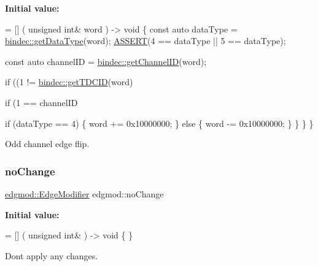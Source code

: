 {\bfseries Initial value\+:}
\begin{DoxyCode}
= [] (
    \textcolor{keywordtype}{unsigned} \textcolor{keywordtype}{int}& word
) -> \textcolor{keywordtype}{void} \{
    \textcolor{keyword}{const} \textcolor{keyword}{auto} dataType = \hyperlink{namespacebindec_a7a98adfd04c65f870f74a423bfd744fe}{bindec::getDataType}(word);
    \hyperlink{_debug_8hpp_aca68c0d4ac8df0838e209fb5300f7be3}{ASSERT}(4 == dataType || 5 == dataType);

    \textcolor{keyword}{const} \textcolor{keyword}{auto} channelID = \hyperlink{namespacebindec_af1997af0743251d010780a8f728fcd7e}{bindec::getChannelID}(word);
    
    \textcolor{keywordflow}{if} ((1 != \hyperlink{namespacebindec_a05afce2b4e8802eeb8b452bc1ec6de8b}{bindec::getTDCID}(word)%
        
        
        \textcolor{keywordflow}{if} (1 == channelID%
            
            \textcolor{keywordflow}{if} (dataType == 4) \{
                word += 0x10000000;
            \} \textcolor{keywordflow}{else} \{
                word -= 0x10000000;
            \}
        \}
    \}
\}
\end{DoxyCode}


Odd channel edge flip. 

\mbox{\label{namespaceedgmod_a912724097db2099cc7793a83e42673d7}} 
\subsubsection{\texorpdfstring{no\+Change}{noChange}}
{\footnotesize\ttfamily \hyperlink{namespaceedgmod_abd975beb42f73310619eb134f62d7712}{edgmod\+::\+Edge\+Modifier} edgmod\+::no\+Change}

{\bfseries Initial value\+:}
\begin{DoxyCode}
= [] (
    \textcolor{keywordtype}{unsigned} \textcolor{keywordtype}{int}&
) -> \textcolor{keywordtype}{void} \{ \}
\end{DoxyCode}


Don\textquotesingle{}t apply any changes. 

